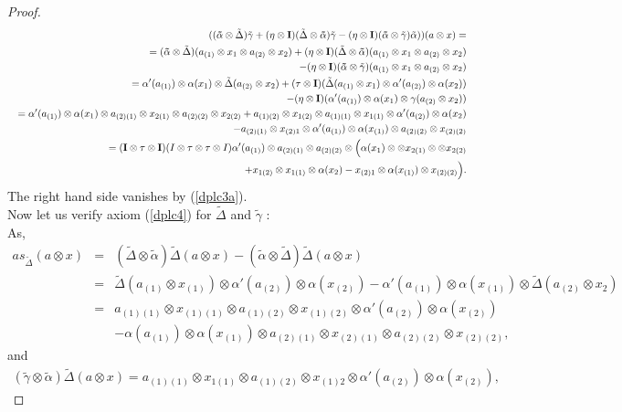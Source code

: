 \documentclass[10pt,a4paper]{amsart}
\begin{document}
\begin{proof}
\begin{eqnarray}
&&\qquad ({\bf (\tilde\alpha}\otimes\tilde\Delta)\tilde\gamma+(\eta\otimes{\bf I} )(\tilde\Delta\otimes {\bf \tilde\alpha})\tilde\gamma
-(\eta\otimes {\bf I})({\bf \tilde\alpha}\otimes\tilde\gamma)\tilde\alpha))(a\otimes x)=\nonumber\\
&&=({\bf \tilde\alpha}\otimes\tilde\Delta)(a_{(1)}\otimes x_{1}\otimes a_{(2)}\otimes x_{2})
+(\eta\otimes {\bf I})(\tilde\Delta\otimes {\bf \tilde\alpha})(a_{(1)}\otimes x_{1}\otimes a_{(2)}\otimes x_{2})\nonumber\\
&&\quad-(\eta\otimes {\bf I})({\bf \tilde\alpha}\otimes\tilde\gamma)(a_{(1)}\otimes x_{1}\otimes a_{(2)}\otimes x_{2})\nonumber\\
&&=\alpha'(a_{(1)})\otimes \alpha(x_{1})\otimes\tilde\Delta(a_{(2)}\otimes x_{2})
+(\tau\otimes {\bf I})(\tilde\Delta(a_{(1)}\otimes x_{1})\otimes \alpha'(a_{(2)})\otimes \alpha(x_{2}))\nonumber\\
&&\quad-(\eta\otimes {\bf I})(\alpha'(a_{(1)})\otimes \alpha(x_{1})\otimes\gamma(a_{(2)}\otimes x_{2}))\nonumber\\
&&=\alpha'(a_{(1)})\otimes\alpha(x_{1})\otimes a_{(2)(1)}\otimes x_{2(1)}\otimes a_{(2)(2)}\otimes x_{2(2)}
+a_{(1)(2)}\otimes x_{1(2)}\otimes a_{(1)(1)}\otimes x_{1(1)}\otimes \alpha'(a_{(2)})\otimes \alpha(x_{2})\nonumber\\
&&\quad-a_{(2)(1)}\otimes x_{(2)1}\otimes \alpha'(a_{(1)})\otimes\alpha(x_{(1)})\otimes a_{(2)(2)}\otimes x_{(2)(2)}\nonumber\\
&&=({\bf I}\otimes \tau\otimes{\bf I})(I\otimes\tau\otimes\tau\otimes I)
\alpha'(a_{(1)})\otimes a_{(2)(1)}\otimes a_{(2)(2)}\otimes\Big(\alpha(x_{1})\otimes \otimes x_{2(1)}\otimes \otimes x_{2(2)}\nonumber\\
&&\quad+x_{1(2)}\otimes x_{1(1)}\otimes \alpha(x_{2})-x_{(2)1}\otimes\alpha(x_{(1)})\otimes x_{(2)(2)}\Big).\nonumber
\end{eqnarray}
The right hand side vanishes by (\ref{dplc3a}).\\
Now let us verify axiom (\ref{dplc4}) for $\tilde\Delta$ and $\tilde\gamma$ :\\
As,
\begin{eqnarray}
 as_{\tilde\Delta}(a\otimes x)
&=&(\tilde\Delta\otimes \tilde\alpha)\tilde\Delta(a\otimes x)-(\tilde\alpha\otimes\tilde\Delta)\tilde\Delta(a\otimes x)\nonumber\\
&=&\tilde\Delta(a_{(1)}\otimes x_{(1)})\otimes \alpha'(a_{(2)})\otimes \alpha(x_{(2)})-\alpha'(a_{(1)})\otimes \alpha(x_{(1)})\otimes\tilde\Delta(a_{(2)}\otimes x_{2})\nonumber\\
&=&a_{(1)(1)}\otimes x_{(1)(1)}\otimes a_{(1)(2)}\otimes x_{(1)(2)}\otimes\alpha'(a_{(2)})\otimes \alpha(x_{(2)})\nonumber\\
&&-\alpha(a_{(1)})\otimes\alpha(x_{(1)})\otimes a_{(2)(1)}\otimes x_{(2)(1)}\otimes a_{(2)(2)}\otimes x_{(2)(2)}\nonumber,
\end{eqnarray}
and
\begin{eqnarray}
 (\tilde\gamma\otimes \tilde\alpha)\tilde\Delta(a\otimes x)
=a_{(1)(1)}\otimes x_{1(1)}\otimes a_{(1)(2)}\otimes x_{(1)2}\otimes\alpha'(a_{(2)})\otimes \alpha(x_{(2)}),\nonumber
\end{eqnarray}


\end{proof}
\end{document}
